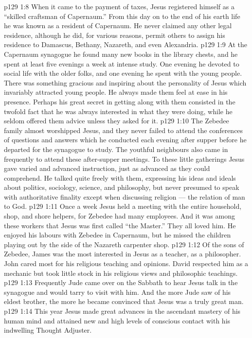 \vs p129 1:8 When it came to the payment of taxes, Jesus registered himself as a “skilled craftsman of Capernaum.” From this day on to the end of his earth life he was known as a resident of Capernaum. He never claimed any other legal residence, although he did, for various reasons, permit others to assign his residence to Damascus, Bethany, Nazareth, and even Alexandria.
\vs p129 1:9 At the Capernaum synagogue he found many new books in the library chests, and he spent at least five evenings a week at intense study. One evening he devoted to social life with the older folks, and one evening he spent with the young people. There was something gracious and inspiring about the personality of Jesus which invariably attracted young people. He always made them feel at ease in his presence. Perhaps his great secret in getting along with them consisted in the twofold fact that he was always interested in what they were doing, while he seldom offered them advice unless they asked for it.
\vs p129 1:10 The Zebedee family almost worshipped Jesus, and they never failed to attend the conferences of questions and answers which he conducted each evening after supper before he departed for the synagogue to study. The youthful neighbours also came in frequently to attend these after\hyp{}supper meetings. To these little gatherings Jesus gave varied and advanced instruction, just as advanced as they could comprehend. He talked quite freely with them, expressing his ideas and ideals about politics, sociology, science, and philosophy, but never presumed to speak with authoritative finality except when discussing religion --- the relation of man to God.
\vs p129 1:11 Once a week Jesus held a meeting with the entire household, shop, and shore helpers, for Zebedee had many employees. And it was among these workers that Jesus was first called “the Master.” They all loved him. He enjoyed his labours with Zebedee in Capernaum, but he missed the children playing out by the side of the Nazareth carpenter shop.
\vs p129 1:12 Of the sons of Zebedee, James was the most interested in Jesus as a teacher, as a philosopher. John cared most for his religious teaching and opinions. David respected him as a mechanic but took little stock in his religious views and philosophic teachings.
\vs p129 1:13 Frequently Jude came over on the Sabbath to hear Jesus talk in the synagogue and would tarry to visit with him. And the more Jude saw of his eldest brother, the more he became convinced that Jesus was a truly great man.
\vs p129 1:14 \pc This year Jesus made great advances in the ascendant mastery of his human mind and attained new and high levels of conscious contact with his indwelling Thought Adjuster.
